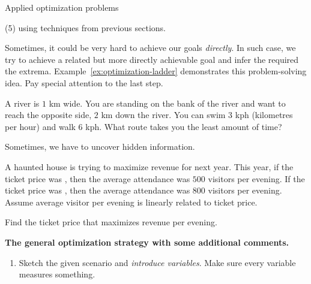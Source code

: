 \documentclass[../main.tex]{subfiles}
\begin{document}
\begin{lesson}{Applied optimization problems}
\begin{example}
    (5)  using techniques from previous sections.

    \clearpage
  \end{example}


  Sometimes, it could be very hard to achieve our goals \emph{directly}. In such case, we try to achieve a related but more directly achievable goal and infer the required the extrema. Example~\ref{ex:optimization-ladder} demonstrates this problem-solving idea. Pay special attention to the last step.
  \begin{example} \label{ex:optimization-swim}
    A  river is \(1\) km wide. You are standing on the bank of the river and want to reach the opposite side, \(2\) km down the river. You can swim \(3\) kph (kilometres per hour) and walk \(6\) kph. What route takes you the least amount of time?

    \hfill{}
  \end{example}

  Sometimes, we have to uncover hidden information. 

  \begin{example}
    A haunted house is trying to maximize revenue for next year. This year, if the ticket price was , then the average attendance was \(500\) visitors per evening. If the ticket price was , then the average attendance was \(800\) visitors per evening.  Assume average visitor per evening is linearly related to ticket price.

    Find the ticket price that maximizes revenue per evening. 
  \end{example}
  \clearpage

  \textbf{The general optimization strategy with some additional comments.}
  \label{page:optimization-strategy}
  \begin{enumerate}[label=(\arabic*)]
    \item Sketch the given scenario and \emph{introduce variables}. Make sure every variable measures something.


\end{enumerate}
\end{lesson}
\end{document}
